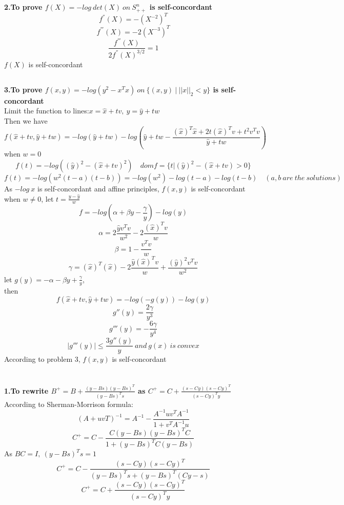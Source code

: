 \documentclass[UTF8]{ctexart}
\begin{document}
\subsection{}
\textbf{2.To prove $f(X)=-log\ det(X)\ on\ S^{n}_{++}$ is self-concordant}\\
$$f^{''}(X)=-(X^{-2})^{T}$$
$$f^{'''}(X)=-2(X^{-3})^{T}$$
$$\frac{f^{'''}(X)}{2f^{''}(X)^{3/2}}=1$$
$f(X)$ is self-concordant\\

\subsection{}
\textbf{3.To prove $f(x,y)=-log(y^{2}-x^{T}x)\ on\ \{(x,y)\ |\ ||x||_{2}<y\}$ is self-concordant}\\
Limit the function to lines:$x=\hat x+tv,\ y= \hat y +tw$\\
Then we have
$$f( \hat x +tv, \hat y +tw)=-log(\hat y +tw) - log (\hat y +tw -\frac{(\hat x)^{T}\hat x +2t (\hat x)^{T}v+t^{2}v^{T}v}{\hat y +tw})$$
when $w=0$
$$f(t)=-log((\hat y)^{2}-(\hat x+tv)^{2})\quad dom f =\{ t \big| (\hat y)^{2}-(\hat x+tv) > 0\}$$
$$f(t)=-log(w^{2}(t-a)(t-b))=-log(w^{2})-log(t-a)-log(t-b)\quad (a,b\ are\ the\ solutions)$$
As $-log\ x$ is self-concordant and affine principles, $f(x,y)$ is self-concordant\\
when $w\neq0$, let $t=\frac{y-\hat y}{w}$\\
$$f=-log(\alpha+\beta y - \frac{\gamma}{y})-log(y)$$
$$\alpha=2\frac{\hat y v^{T}v}{w^{2}}-2\frac{(\hat x)^{T}v}{w}$$
$$\beta=1-\frac{v^{T}v}{w}$$
$$\gamma=(\hat x)^{T}(\hat x)-2\frac{\hat y (\hat x)^{T}v}{w}+\frac{(\hat y )^{2} v^{T}v}{w^{2}}$$
let $g(y)=-\alpha - \beta y +\frac{\gamma}{y} $,\\
then $$f(\hat x +tv, \hat y +tw)=-log(-g(y))-log(y)$$
$$g''(y)=\frac{2\gamma}{y^{3}}$$
$$g'''(y)=-\frac{6\gamma}{y^{4}}$$
$$ |g'''(y)| \leq \frac{3g''(y)}{y}\ and\ g(x)\ is \ convex$$
According to problem 3, $f(x,y)$ is self-concordant\\

\section{}
\subsection{}

\textbf{1.To rewrite $B^{+}=B+\frac{(y-Bs)(y-Bs)^{T}}{(y-Bs)^{T}s}$ as $C^{+}=C+\frac{(s-Cy)(s-Cy)^{T}}{(s-Cy)^{T}y}$}\\
According to Sherman-Morrison formula:
$$(A+uv{T})^{-1}=A^{-1}-\frac{A^{-1}uv^{T}A^{-1}}{1+v^{T}A^{-1}u}$$
$$C^{+}=C-\frac{C(y-Bs)(y-Bs)^{T}C}{1+(y-Bs)^{T}C(y-Bs)}$$
As $BC=I,\ (y-Bs)^{T}s=1$
$$C^{+}=C-\frac{(s-Cy)(s-Cy)^{T}}{(y-Bs)^{T}s+(y-Bs)^{T}(Cy-s)}$$
$$C^{+}=C+\frac{(s-Cy)(s-Cy)^{T}}{(s-Cy)^{T}y}$$
\end{document}
